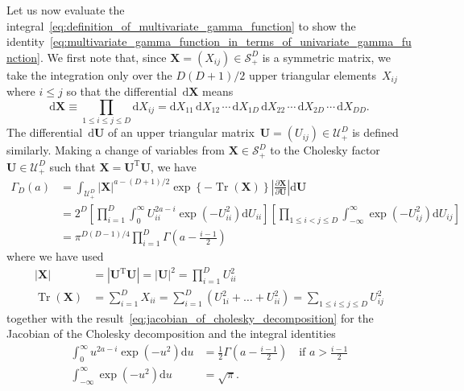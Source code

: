 \documentclass[12pt,a4paper]{article}
\begin{document}
Let us now evaluate the integral~\eqref{eq:definition_of_multivariate_gamma_function}
to show the identity~\eqref{eq:multivariate_gamma_function_in_terms_of_univariate_gamma_function}.
We first note that,
since $\mathbf{X} = \left( X_{ij} \right) \in \mathcal{S}_{+}^{D}$ is a symmetric matrix,
we take the integration only over the $D(D + 1)/2$ upper triangular elements~$X_{ij}$
where $i \leqslant j$ so that the differential~$\mathrm{d}\mathbf{X}$ means
\begin{equation}
\mathrm{d}\mathbf{X} \equiv \prod_{1 \leqslant i \leqslant j \leqslant D} \mathrm{d}X_{ij}
= \mathrm{d}X_{11} \, \mathrm{d}X_{12} \, \cdots \, \mathrm{d}X_{1D} \,
\mathrm{d}X_{22} \, \cdots \, \mathrm{d}X_{2D} \, \cdots \, \mathrm{d}X_{DD} .
\end{equation}
The differential~$\mathrm{d}\mathbf{U}$ of
an upper triangular matrix~$\mathbf{U} = \left( U_{ij} \right) \in \mathcal{U}_{+}^{D}$
is defined similarly.
Making a change of variables from $\mathbf{X} \in \mathcal{S}_{+}^{D}$ to
the Cholesky factor~$\mathbf{U} \in \mathcal{U}_{+}^{D}$
such that $\mathbf{X} = \mathbf{U}^{\operatorname{T}} \mathbf{U}$,
we have
\begin{align}
\Gamma_D (a) &=
\int_{\mathcal{U}_{+}^{D}}
\left|\mathbf{X}\right|^{a - (D + 1)/2}
\exp\left\{-\operatorname{Tr}\left(\mathbf{X}\right)\right\}
\left| \frac{\partial\mathbf{X}}{\partial\mathbf{U}} \right|
\mathrm{d}\mathbf{U}
\label{eq:multivariate_gamma_function_in_terms_of_integral_over_upper_triangular_matrix}
\\
&= 2^{D}
\left[
\prod_{i=1}^{D} \int_{0}^{\infty} U_{ii}^{2a - i} \exp\left( -U_{ii}^{2} \right) \mathrm{d}U_{ii}
\right]
\left[
\prod_{1 \leqslant i < j \leqslant D}
\int_{-\infty}^{\infty} \exp\left( -U_{ij}^2 \right) \mathrm{d}U_{ij}
\right]
\\
&= \pi^{D(D - 1)/4} \prod_{i=1}^{D} \Gamma\left(a - \frac{i - 1}{2}\right)
\end{align}
where we have used
\begin{align}
\left| \mathbf{X} \right| &= \left| \mathbf{U}^{\operatorname{T}} \mathbf{U} \right|
= \left| \mathbf{U} \right|^2
= \prod_{i=1}^{D} U_{ii}^2 \\
\operatorname{Tr}\left( \mathbf{X} \right) &= \sum_{i=1}^{D} X_{ii}
= \sum_{i=1}^{D} \left( U_{1i}^2 + \dots + U_{ii}^2 \right)
= \sum_{1 \leqslant i \leqslant j \leqslant D} U_{ij}^2
\end{align}
together with the result~\eqref{eq:jacobian_of_cholesky_decomposition} for
the Jacobian of the Cholesky decomposition and
the integral identities
\begin{align}
\int_{0}^{\infty} u^{2a - i} \exp\left( -u^{2} \right) \mathrm{d}u
&= \frac{1}{2} \Gamma\left(a - \frac{i - 1}{2}\right) \quad \text{if $a > \frac{i - 1}{2}$} \\
\int_{-\infty}^{\infty} \exp\left( -u^{2} \right) \mathrm{d}u &= \sqrt{\pi} .
\end{align}
\end{document}
